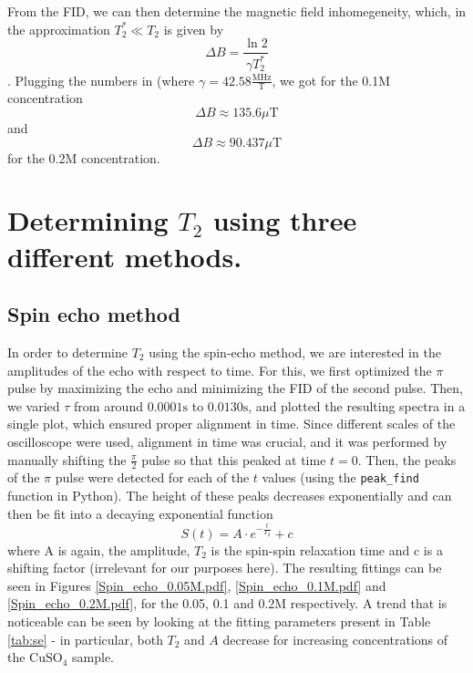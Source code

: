 \documentclass[12pt]{article}
\begin{document}
From the FID, we can then determine the magnetic field inhomegeneity, which, in the approximation $T_2^* \ll T_2$ is given by \[
\Delta B = \frac{\ln2}{\gamma T_2^*}
\].
Plugging the numbers in (where $\gamma = 42.58 \frac{\text{MHz}}{\text{T}}$, we got for the 0.1M concentration \[
	\Delta B \approx 135.6 \mu\text{T}
\]
and \[
	\Delta B \approx 90.437 \mu\text{T}
\]
for the 0.2M concentration.


%

\section{Determining $T_2$ using three different methods.}
\subsection{Spin echo method}
In order to determine $T_2$ using the spin-echo method, we are interested in the amplitudes of the echo with respect to time.
For this, we first optimized the $\pi$ pulse by maximizing the echo and minimizing the FID of the second pulse. Then, we varied $\tau$ from around $0.0001\text{s}$ to $0.0130 \text{s}$, and plotted the resulting spectra in a single plot, which ensured proper alignment in time. Since different scales of the oscilloscope were used, alignment in time was crucial, and it was performed by manually shifting the $\frac{\pi}{2}$ pulse so that this peaked at time $t = 0$.
Then, the peaks of the $\pi$ pulse were detected for each of the $t$ values (using the \verb|peak_find| function in Python). The height of these peaks decreases exponentially and can then be fit into a decaying exponential function \[
	S(t) = A \cdot e^{-\frac{t}{T_2}} + c
\]
where A is again, the amplitude, $T_2$ is the spin-spin relaxation time and c is a shifting factor (irrelevant for our purposes here).
The resulting fittings can be seen in Figures \ref{Spin_echo_0.05M.pdf}, \ref{Spin_echo_0.1M.pdf} and \ref{Spin_echo_0.2M.pdf}, for the 0.05, 0.1 and 0.2M respectively.
A trend that is noticeable can be seen by looking at the fitting parameters present in Table \ref{tab:se} - in particular, both $T_2$ and $A$ decrease for increasing concentrations of the $\text{CuSO}_4$ sample.
\end{document}
